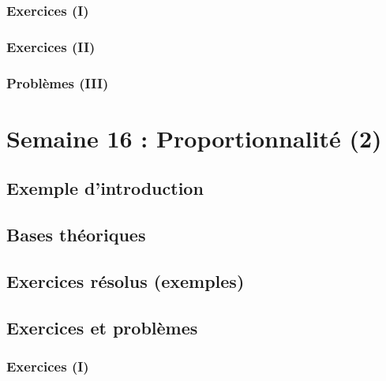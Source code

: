 \documentclass[
  12pt,
]{book}
\begin{document}
\hypertarget{exercices-i-14}{%
\subsection{Exercices (I)}\label{exercices-i-14}}

\hypertarget{exercices-ii-14}{%
\subsection{Exercices (II)}\label{exercices-ii-14}}

\hypertarget{probluxe8mes-iii-14}{%
\subsection{Problèmes (III)}\label{probluxe8mes-iii-14}}

\hypertarget{semaine-16-proportionnalituxe9-2}{%
\chapter{Semaine 16 : Proportionnalité (2)}\label{semaine-16-proportionnalituxe9-2}}

\hypertarget{exemple-dintroduction-15}{%
\section{Exemple d'introduction}\label{exemple-dintroduction-15}}

\hypertarget{bases-thuxe9oriques-15}{%
\section{Bases théoriques}\label{bases-thuxe9oriques-15}}

\hypertarget{exercices-ruxe9solus-exemples-15}{%
\section{Exercices résolus (exemples)}\label{exercices-ruxe9solus-exemples-15}}

\hypertarget{exercices-et-probluxe8mes-15}{%
\section{Exercices et problèmes}\label{exercices-et-probluxe8mes-15}}

\hypertarget{exercices-i-15}{%
\subsection{Exercices (I)}\label{exercices-i-15}}
\end{document}
